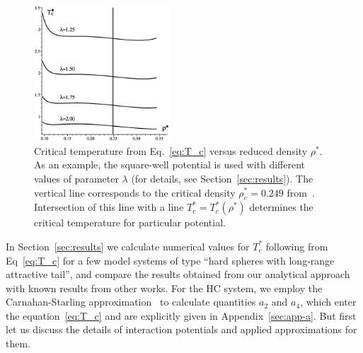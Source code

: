 \begin{figure}[htbp]
	\includegraphics[width=0.45\textwidth,angle=0]{critical_temp_vs_rho}
	\caption{Critical temperature from Eq.~\eqref{eq:T_c} versus reduced density $\rho^*$. As an example, the square-well potential is used with different values of parameter $\lambda$ (for details, see Section~\ref{sec:results}). The vertical line corresponds to the critical density $\rho^*_c=0.249$ from~\cite{YukhJSP1995}. Intersection of this line with a line $T_c^* = T_c^*(\rho^*)$ determines the critical temperature for particular potential.}
	\label{fig:t_c_vs_rho}
\end{figure}

In Section~\ref{sec:results} we calculate numerical values for $T^*_c$ following from Eq~\eqref{eq:T_c} for a few model systems of type ``hard spheres with long-range attractive tail'', and compare the results obtained from our analytical approach with known results from other works. For the HC system, we employ the Carnahan-Starling approximation~\cite{CarnahanStarling1969} to calculate quantities $a_2$ and $a_4$, which enter the equation~\eqref{eq:T_c} and are explicitly given in Appendix~\ref{sec:app-a}. But first let us discuss the details of interaction potentials and applied approximations for them.
